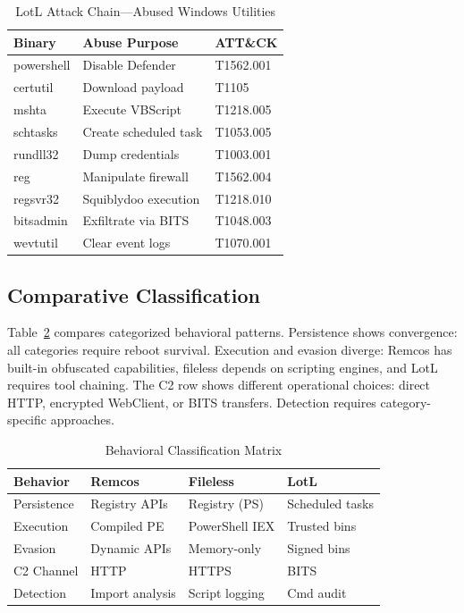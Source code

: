 \documentclass[sigconf]{acmart}
\begin{document}
\begin{table}[h]
\caption{LotL Attack Chain---Abused Windows Utilities}
\label{tab:lotl}
\small
\begin{tabular}{@{}p{1.4cm}p{3.3cm}l@{}}
\toprule
\textbf{Binary} & \textbf{Abuse Purpose} & \textbf{ATT\&CK} \\
\midrule
powershell & Disable Defender & T1562.001 \\
certutil & Download payload & T1105 \\
mshta & Execute VBScript & T1218.005 \\
schtasks & Create scheduled task & T1053.005 \\
rundll32 & Dump credentials & T1003.001 \\
reg & Manipulate firewall & T1562.004 \\
regsvr32 & Squiblydoo execution & T1218.010 \\
bitsadmin & Exfiltrate via BITS & T1048.003 \\
wevtutil & Clear event logs & T1070.001 \\
\bottomrule
\end{tabular}
\end{table}


\subsection{Comparative Classification}

\vspace{0.5em}
\qquad Table~\ref{tab:classification} compares categorized behavioral patterns. Persistence shows convergence: all categories require reboot survival. Execution and evasion diverge: Remcos has built-in obfuscated capabilities, fileless depends on scripting engines, and LotL requires tool chaining. The C2 row shows different operational choices: direct HTTP, encrypted WebClient, or BITS transfers. Detection requires category-specific approaches.

\begin{table}[h]
\caption{Behavioral Classification Matrix}
\label{tab:classification}
\small
\begin{tabular}{@{}p{1.5cm}p{1.85cm}p{1.85cm}p{1.85cm}@{}}
\toprule
\textbf{Behavior} & \textbf{Remcos} & \textbf{Fileless} & \textbf{LotL} \\
\midrule
Persistence & Registry APIs & Registry (PS) & Scheduled tasks \\
Execution & Compiled PE & PowerShell IEX & Trusted bins \\
Evasion & Dynamic APIs & Memory-only & Signed bins \\
C2 Channel & HTTP & HTTPS & BITS \\
Detection & Import analysis & Script logging & Cmd audit \\
\bottomrule
\end{tabular}
\end{table}
\end{document}

